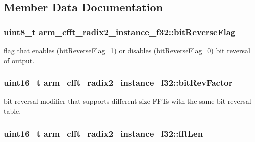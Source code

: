 \subsection{Member Data Documentation}
\hypertarget{structarm__cfft__radix2__instance__f32_af713b4ac5256a19bc965c89fe3005fa3}{
\subsubsection[{bit\-Reverse\-Flag}]{\setlength{\rightskip}{0pt plus 5cm}uint8\-\_\-t arm\-\_\-cfft\-\_\-radix2\-\_\-instance\-\_\-f32\-::bit\-Reverse\-Flag}}\label{structarm__cfft__radix2__instance__f32_af713b4ac5256a19bc965c89fe3005fa3}
flag that enables (bit\-Reverse\-Flag=1) or disables (bit\-Reverse\-Flag=0) bit reversal of output. \hypertarget{structarm__cfft__radix2__instance__f32_ac1688dafa5177f6b1505abbfd0cf8b21}{
\subsubsection[{bit\-Rev\-Factor}]{\setlength{\rightskip}{0pt plus 5cm}uint16\-\_\-t arm\-\_\-cfft\-\_\-radix2\-\_\-instance\-\_\-f32\-::bit\-Rev\-Factor}}\label{structarm__cfft__radix2__instance__f32_ac1688dafa5177f6b1505abbfd0cf8b21}
bit reversal modifier that supports different size F\-F\-Ts with the same bit reversal table. \hypertarget{structarm__cfft__radix2__instance__f32_a2f915a1c29635c1623086aaaa726be8f}{
\subsubsection[{fft\-Len}]{\setlength{\rightskip}{0pt plus 5cm}uint16\-\_\-t arm\-\_\-cfft\-\_\-radix2\-\_\-instance\-\_\-f32\-::fft\-Len}}\label{structarm__cfft__radix2__instance__f32_a2f915a1c29635c1623086aaaa726be8f}
